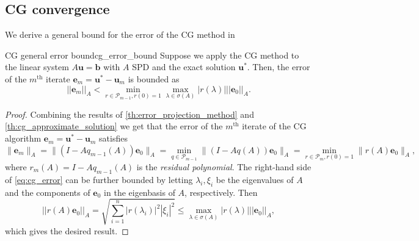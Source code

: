 \subsection{CG convergence}\label{sec:cg_convergence}
We derive a general bound for the error of the CG method in
\begin{fancyth}{CG general error bound}{cg_error_bound}
  Suppose we apply the CG method to the linear system $A\mathbf{u} = \mathbf{b}$ with $A$ SPD and the exact solution $\mathbf{u}^*$. Then, the error of the $m^{\text{th}}$ iterate $\mathbf{e}_m = \mathbf{u}^* - \mathbf{u}_m$ is bounded as
  \begin{equation}
    ||\mathbf{e}_m||_A < \min_{r \in \mathcal{P}_{m-1}, r(0) = 1} \max_{\lambda \in \sigma(A)} |r(\lambda)| ||\mathbf{e}_0||_A.
    \label{eq:cg_error_bound}
  \end{equation}
\end{fancyth}
\begin{proof}
  Combining the results of \cref{th:error_projection_method} and \cref{th:cg_approximate_solution} we get that the error of the $m^{\text{th}}$ iterate of the CG algorithm $\mathbf{e}_m = \mathbf{u}^* - \mathbf{u}_m$ satisfies
  \begin{equation}
    \|\mathbf{e}_m\|_A = \|(I - Aq_{m-1}(A))\mathbf{e}_0\|_A = \min_{q \in \mathcal{P}_{m-1}}\|(I - Aq(A))\mathbf{e}_0\|_A = \min_{r \in \mathcal{P}_{m}, r(0) = 1}\|r(A)\mathbf{e}_0\|_A,
    \label{eq:cg_error}
  \end{equation}
  where $r_m(A) = I - Aq_{m-1}(A)$ is the \textit{residual polynomial}. The right-hand side of \cref{eq:cg_error} can be further bounded by letting $\lambda_i, \xi_i$ be the eigenvalues of $A$ and the components of $\mathbf{e}_0$ in the eigenbasis of $A$, respectively. Then
  \[
    ||r(A)\mathbf{e}_0||_A = \sqrt{\sum_{i=1}^n |r(\lambda_i)|^2 |\xi_i|^2} \leq \max_{\lambda \in \sigma(A)} |r(\lambda)| ||\mathbf{e}_0||_A,
  \]
  which gives the desired result.
\end{proof}

